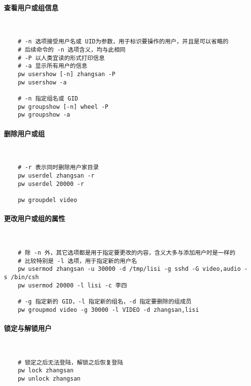 \paragraph{查看用户或组信息}~

\begin{lstlisting}
    # -n 选项接受用户名或 UID为参数，用于标识要操作的用户，并且是可以省略的
    # 后续命令的 -n 选项含义，均与此相同
    # -P 以人类宜读的形式打印信息
    # -a 显示所有用户的信息
    pw usershow [-n] zhangsan -P
    pw usershow -a

    # -n 指定组名或 GID
    pw groupshow [-n] wheel -P
    pw groupshow -a
\end{lstlisting}

\paragraph{删除用户或组}~

\begin{lstlisting}
    # -r 表示同时删除用户家目录
    pw userdel zhangsan -r
    pw userdel 20000 -r

    pw groupdel video
\end{lstlisting}

\paragraph{更改用户或组的属性}~

\begin{lstlisting}
    # 除 -n 外，其它选项都是用于指定要更改的内容，含义大多与添加用户时是一样的
    # 比较特别是 -l 选项，用于指定新的用户名
    pw usermod zhangsan -u 30000 -d /tmp/lisi -g sshd -G video,audio -s /bin/csh
    pw usermod 20000 -l lisi -c 李四

    # -g 指定新的 GID，-l 指定新的组名，-d 指定要删除的组成员
    pw groupmod video -g 30000 -l VIDEO -d zhangsan,lisi
\end{lstlisting}

\paragraph{锁定与解锁用户}~

\begin{lstlisting}
    # 锁定之后无法登陆，解锁之后恢复登陆
    pw lock zhangsan
    pw unlock zhangsan
\end{lstlisting}